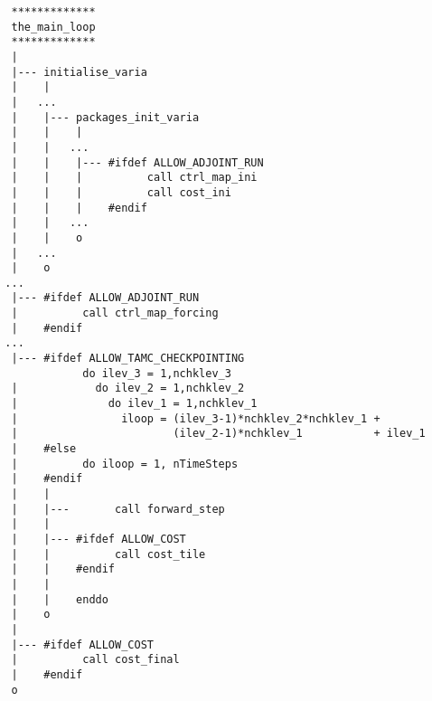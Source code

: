 
{\scriptsize
\begin{verbatim}
   *************
   the_main_loop
   *************
   |
   |--- initialise_varia
   |    |
   |   ...
   |    |--- packages_init_varia
   |    |    |
   |    |   ...
   |    |    |--- #ifdef ALLOW_ADJOINT_RUN
   |    |    |          call ctrl_map_ini
   |    |    |          call cost_ini
   |    |    |    #endif
   |    |   ...
   |    |    o
   |   ...
   |    o
  ...
   |--- #ifdef ALLOW_ADJOINT_RUN
   |          call ctrl_map_forcing
   |    #endif
  ...
   |--- #ifdef ALLOW_TAMC_CHECKPOINTING
              do ilev_3 = 1,nchklev_3
   |            do ilev_2 = 1,nchklev_2
   |              do ilev_1 = 1,nchklev_1
   |                iloop = (ilev_3-1)*nchklev_2*nchklev_1 +
   |                        (ilev_2-1)*nchklev_1           + ilev_1
   |    #else
   |          do iloop = 1, nTimeSteps
   |    #endif
   |    |
   |    |---       call forward_step
   |    |
   |    |--- #ifdef ALLOW_COST
   |    |          call cost_tile
   |    |    #endif
   |    |
   |    |    enddo
   |    o
   |
   |--- #ifdef ALLOW_COST
   |          call cost_final
   |    #endif
   o
\end{verbatim}
}
